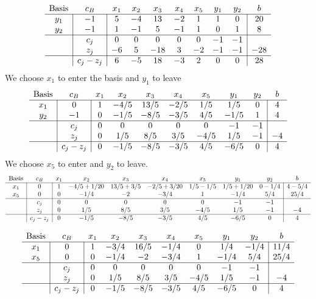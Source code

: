 \documentclass[11pt]{article}
\begin{document}
\[
\begin{array}{c|c|ccccccc|c}
\text{Basis} & c_B & x_1 & x_2 & x_3 & x_4 & x_5 & y_1 & y_2 & b \\ \hline
y_1 & -1 & 5 & -4 & 13 & -2 & 1 & 1 & 0 & 20 \\
y_2 & -1 & 1 & -1 & 5 & -1 & 1 & 0 & 1 & 8 \\ \hline
 & c_j & 0 & 0 & 0 & 0 & 0 & -1 & -1 & \\ 
 & z_j & -6 & 5 & -18 & 3 & -2 & -1 & -1 & -28 \\ \hline
 & c_j - z_j & 6 & -5 & 18 & -3 & 2 & 0 & 0 & 28
\end{array}
\]
We choose $x_1$ to enter the basis and $y_1$ to leave
\[
\begin{array}{c|c|ccccccc|c}
\text{Basis} & c_B & x_1 & x_2 & x_3 & x_4 & x_5 & y_1 & y_2 & b \\ \hline
x_1 & 0 & 1 & -4/5 & 13/5 & -2/5 & 1/5 & 1/5 & 0 & 4 \\
y_2 & -1 & 0 & -1/5 & -8/5 & -3/5 & 4/5 & -1/5 & 1 & 4 \\ \hline
 & c_j & 0 & 0 & 0 & 0 & 0 & -1 & -1 & \\ 
 & z_j & 0 & 1/5 & 8/5 & 3/5 & -4/5 & 1/5 & -1 & -4 \\ \hline
 & c_j - z_j & 0 & -1/5 & -8/5 & -3/5 & 4/5 & -6/5 & 0 & 4
\end{array}
\]
We choose $x_5$ to enter and $y_2$ to leave.
\[
\begin{array}{c|c|ccccccc|c}
\text{Basis} & c_B & x_1 & x_2 & x_3 & x_4 & x_5 & y_1 & y_2 & b \\ \hline
x_1 & 0 & 1 & -4/5 + 1/20 & 13/5 + 3/5 & -2/5 + 3/20 & 1/5 - 1/5 & 1/5+ 1/20 & 0 - 1/4& 4 - 5/4 \\
x_5 & 0 & 0 & -1/4 & -2 & -3/4 & 1 & -1/4 & 5/4 & 25/4 \\ \hline
 & c_j & 0 & 0 & 0 & 0 & 0 & -1 & -1 & \\ 
 & z_j & 0 & 1/5 & 8/5 & 3/5 & -4/5 & 1/5 & -1 & -4 \\ \hline
 & c_j - z_j & 0 & -1/5 & -8/5 & -3/5 & 4/5 & -6/5 & 0 & 4
\end{array}
\]

\[
\begin{array}{c|c|ccccccc|c}
\text{Basis} & c_B & x_1 & x_2 & x_3 & x_4 & x_5 & y_1 & y_2 & b \\ \hline
x_1 & 0 & 1 & -3/4 & 16/5 & -1/4 & 0 & 1/4 & - 1/4& 11/4 \\
x_5 & 0 & 0 & -1/4 & -2 & -3/4 & 1 & -1/4 & 5/4 & 25/4 \\ \hline
 & c_j & 0 & 0 & 0 & 0 & 0 & -1 & -1 & \\ 
 & z_j & 0 & 1/5 & 8/5 & 3/5 & -4/5 & 1/5 & -1 & -4 \\ \hline
 & c_j - z_j & 0 & -1/5 & -8/5 & -3/5 & 4/5 & -6/5 & 0 & 4
\end{array}
\]
\end{document}
